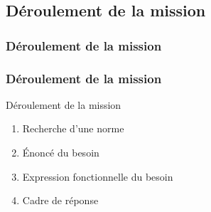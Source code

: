 \subsection{Déroulement de la mission}
\subsubsection{Déroulement de la mission }

\begin{frame}
\frametitle{Déroulement de la mission}
\begin{block}{Déroulement de la mission}
	\begin{enumerate}
	\item Recherche d'une norme
	\item Énoncé du besoin
	\item Expression fonctionnelle du besoin
	\item Cadre de réponse
	\end{enumerate}
	\end{block}
\end{frame}
 
\begin{frame}

	

\end{frame}
  